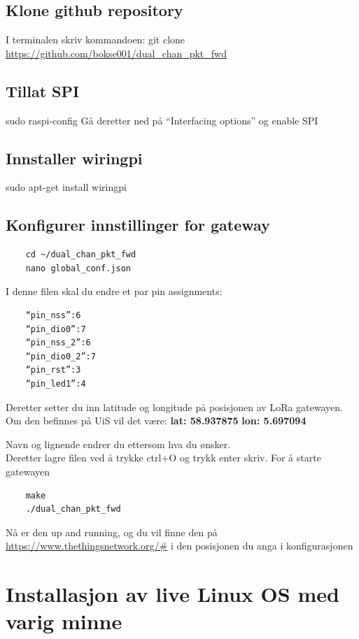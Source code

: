 \documentclass{article}
\begin{document}
\begin{appendices}
\subsection{Klone github repository}

I terminalen skriv kommandoen:
	git clone \\\url{https://github.com/bokse001/dual_chan_pkt_fwd}

\subsection{Tillat SPI}
	sudo raspi-config
Gå deretter ned på “Interfacing options” og enable SPI

\subsection{Innstaller wiringpi}
	sudo apt-get install wiringpi

\subsection{Konfigurer innstillinger for gateway}
\begin{verbatim}
	cd ~/dual_chan_pkt_fwd
	nano global_conf.json
\end{verbatim}

I denne filen skal du endre et par pin assignments:
\begin{verbatim}
	“pin_nss”:6
	“pin_dio0”:7
	“pin_nss_2”:6
	“pin_dio0_2”:7
	“pin_rst”:3
	“pin_led1”:4
\end{verbatim}

Deretter setter du inn latitude og longitude på posisjonen av LoRa gatewayen. Om den befinnes på UiS vil det være:
\textbf{lat: 58.937875}
\textbf{lon: 5.697094}

Navn og lignende endrer du ettersom hva du ønsker.
\\
Deretter lagre filen ved å trykke ctrl+O og trykk enter
skriv. For å starte gatewayen
\begin{verbatim}
	make
	./dual_chan_pkt_fwd
\end{verbatim}
Nå er den up and running, og du vil finne den på \\\url{https://www.thethingsnetwork.org/#} i den posisjonen du anga i konfigurasjonen

\newpage
\section{Installasjon av live Linux OS med varig minne}


\end{appendices}
\end{document}
